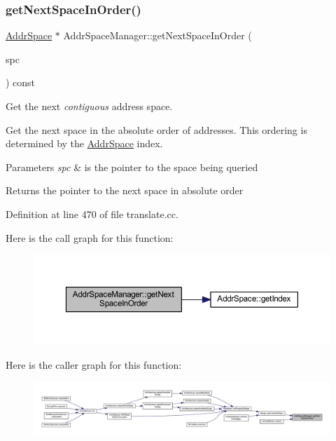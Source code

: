 \subsubsection{\texorpdfstring{getNextSpaceInOrder()}{getNextSpaceInOrder()}}
{\footnotesize\ttfamily \mbox{\hyperlink{class_addr_space}{Addr\+Space}} $\ast$ Addr\+Space\+Manager\+::get\+Next\+Space\+In\+Order (\begin{DoxyParamCaption}\item[{\mbox{\hyperlink{class_addr_space}{Addr\+Space}} $\ast$}]{spc }\end{DoxyParamCaption}) const}



Get the next {\itshape contiguous} address space. 

Get the next space in the absolute order of addresses. This ordering is determined by the \mbox{\hyperlink{class_addr_space}{Addr\+Space}} index. 
\begin{DoxyParams}{Parameters}
{\em spc} & is the pointer to the space being queried \\
\hline
\end{DoxyParams}
\begin{DoxyReturn}{Returns}
the pointer to the next space in absolute order 
\end{DoxyReturn}


Definition at line 470 of file translate.\+cc.

Here is the call graph for this function\+:
\nopagebreak
\begin{figure}[H]
\begin{center}
\leavevmode
\includegraphics[width=350pt]{class_addr_space_manager_abe31b83fccddf3c6d9d35e981f203b19_cgraph}
\end{center}
\end{figure}
Here is the caller graph for this function\+:
\nopagebreak
\begin{figure}[H]
\begin{center}
\leavevmode
\includegraphics[width=350pt]{class_addr_space_manager_abe31b83fccddf3c6d9d35e981f203b19_icgraph}
\end{center}
\end{figure}
\mbox{\label{class_addr_space_manager_ad1a9a620e767ffe8bd929913f882e2a4}} 
